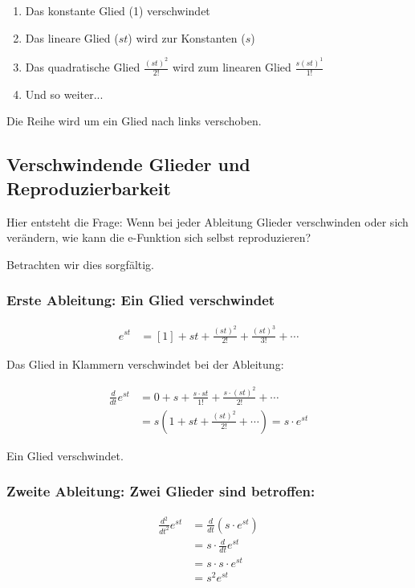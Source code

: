 \documentclass[a4paper,12pt,twoside]{report}
\theoremstyle{definition}
\begin{document}
\begin{enumerate}
	\item Das konstante Glied (1) verschwindet
	\item Das lineare Glied ($st$) wird zur Konstanten ($s$)
	\item Das quadratische Glied $\frac{(st)^2}{2!}$ wird zum linearen Glied $\frac{s(st)^1}{1!}$
	\item Und so weiter...
\end{enumerate}

Die Reihe wird um ein Glied nach links verschoben.

\subsection{Verschwindende Glieder und Reproduzierbarkeit}

Hier entsteht die Frage: Wenn bei jeder Ableitung Glieder verschwinden oder sich verändern, wie kann die e-Funktion sich selbst reproduzieren?

Betrachten wir dies sorgfältig.

\subsubsection*{Erste Ableitung: Ein Glied verschwindet}

\begin{align}
	e^{st} &= \left[1\right] + st + \frac{(st)^2}{2!} + \frac{(st)^3}{3!} + \cdots
\end{align}

Das Glied in Klammern verschwindet bei der Ableitung:

\begin{align}
	\frac{d}{dt} e^{st} &= 0 + s + \frac{s \cdot st}{1!} + \frac{s \cdot (st)^2}{2!} + \cdots\\
	&= s \left(1 + st + \frac{(st)^2}{2!} + \cdots \right) = s \cdot e^{st}
\end{align}

Ein Glied verschwindet.

\subsubsection*{Zweite Ableitung: Zwei Glieder sind betroffen:}

\begin{align}
	\frac{d^2}{dt^2} e^{st} &= \frac{d}{dt} (s \cdot e^{st})\\
	&= s \cdot \frac{d}{dt} e^{st}\\
	&= s \cdot s \cdot e^{st}\\
	&= s^2 e^{st}
\end{align}
\end{document}
